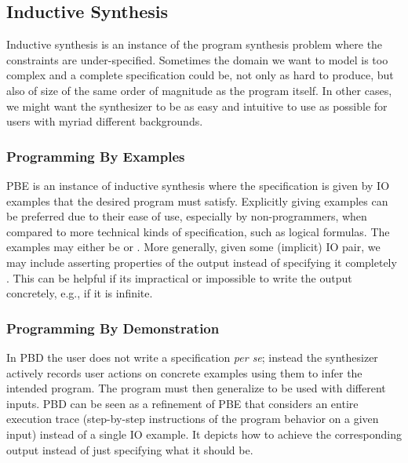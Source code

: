 \subsection{Inductive Synthesis}
\label{sec:inductive}

Inductive synthesis is an instance of the program synthesis problem where the
constraints are under-specified. Sometimes the domain we want to model is too
complex and a complete specification could be, not only as hard to produce, but
also of size of the same order of magnitude as the program itself. In other
cases, we might want the synthesizer to be as easy and intuitive to use as
possible for users with myriad different backgrounds.

\subsubsection{Programming By Examples}

\ac{PBE} is an instance of inductive synthesis where the specification is given
by \ac{IO} examples that the desired program must satisfy. Explicitly giving
examples can be preferred due to their ease of use, especially by
non-programmers, when compared to more technical kinds of specification, such as
logical formulas. The examples may either be  or . More generally, given some
(implicit) \ac{IO} pair, we may include asserting properties of the output
instead of specifying it completely \cite{Gulwani2017, Polozov:2015:FFI}. This
can be helpful if its impractical or impossible to write the output concretely,
e.g., if it is infinite.

\subsubsection{Programming By Demonstration}


In \ac{PBD} the user does not write a specification \textit{per se}; instead the
synthesizer actively records user actions on concrete examples using them to
infer the intended program. The program must then generalize to be used with
different inputs. \ac{PBD} can be seen as a refinement of \ac{PBE} that
considers an entire execution trace (step-by-step instructions of the program
behavior on a given input) instead of a single \ac{IO} example. It depicts how
to achieve the corresponding output instead of just specifying what it should
be.

